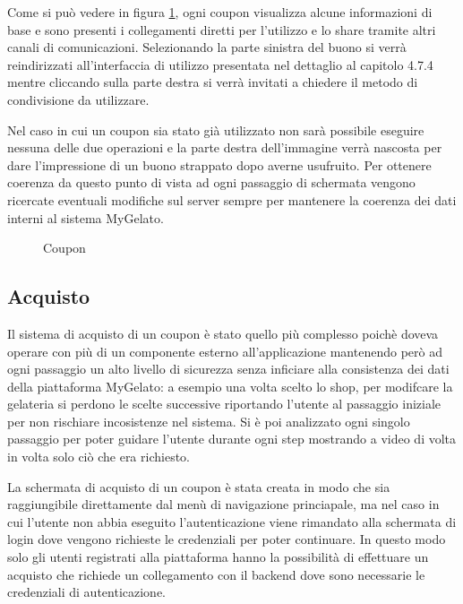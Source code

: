 Come si può vedere in figura \ref{fig:Coupon}, ogni coupon visualizza
alcune informazioni di base e sono presenti i collegamenti diretti
per l'utilizzo e lo share tramite altri canali di comunicazioni. Selezionando
la parte sinistra del buono si verrà reindirizzati all'interfaccia
di utilizzo presentata nel dettaglio al capitolo 4.7.4 mentre cliccando
sulla parte destra si verrà invitati a chiedere il metodo di condivisione
da utilizzare.

Nel caso in cui un coupon sia stato già utilizzato non sarà possibile
eseguire nessuna delle due operazioni e la parte destra dell'immagine
verrà nascosta per dare l'impressione di un buono strappato dopo averne
usufruito. Per ottenere coerenza da questo punto di vista ad ogni
passaggio di schermata vengono ricercate eventuali modifiche sul server
sempre per mantenere la coerenza dei dati interni al sistema MyGelato.

\begin{figure}

\caption{\label{fig:Coupon}Coupon}

\end{figure}


\subsection{Acquisto}

Il sistema di acquisto di un coupon è stato quello più complesso poichè
doveva operare con più di un componente esterno all'applicazione mantenendo
però ad ogni passaggio un alto livello di sicurezza senza inficiare
alla consistenza dei dati della piattaforma MyGelato: a esempio una
volta scelto lo shop, per modifcare la gelateria si perdono le scelte
successive riportando l'utente al passaggio iniziale per non rischiare
incosistenze nel sistema. Si è poi analizzato ogni singolo passaggio
per poter guidare l'utente durante ogni step mostrando a video di
volta in volta solo ciò che era richiesto.

La schermata di acquisto di un coupon è stata creata in modo che sia
raggiungibile direttamente dal menù di navigazione princiapale, ma
nel caso in cui l'utente non abbia eseguito l'autenticazione viene
rimandato alla schermata di login dove vengono richieste le credenziali
per poter continuare. In questo modo solo gli utenti registrati alla
piattaforma hanno la possibilità di effettuare un acquisto che richiede
un collegamento con il backend dove sono necessarie le credenziali
di autenticazione.

